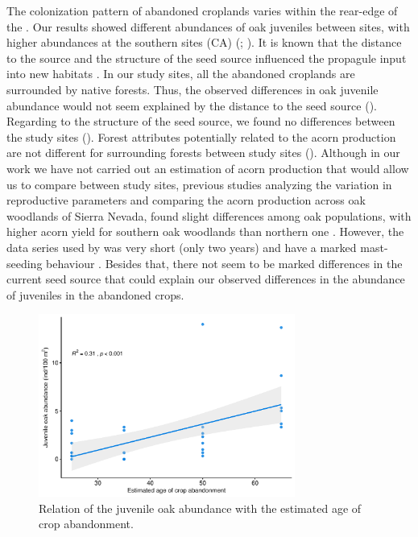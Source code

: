 The colonization pattern of abandoned croplands varies within the rear-edge of the \Qp. Our results showed different abundances of oak juveniles between sites, with higher abundances at the southern sites (CA) (; ). It is known that the distance to the source and the structure of the seed source influenced the propagule input into new habitats \autocites{Nathan2006LongDistanceDispersal,HewittKellman2002TreeSeed,Kureketal2019DispersalDistance}. In our study sites, all the abandoned croplands are surrounded by native forests. Thus, the observed differences in oak juvenile abundance would not seem explained by the distance to the seed source (). Regarding to the structure of the seed source, we found no differences 
between the study sites (). Forest attributes potentially related to the acorn production \autocite[][\emph{e.g.} tree density, basal area,]{GeaIzquierdoetal2006AcornProduction} are not different for surrounding forests between study sites (). Although in our work we have not carried out an estimation of acorn production that would allow us to compare between study sites, previous studies analyzing the variation in reproductive parameters and comparing the acorn production across oak woodlands of Sierra Nevada, found slight differences among oak populations, with higher acorn yield for southern oak woodlands than northern one \autocite{Leal2013AnalisisCrecimiento}.  However, the data series used by \citet{Leal2013AnalisisCrecimiento} was very short (only two years) and \Qpy have a marked mast-seeding behaviour \autocites{Bravoetal2008SelviculturaMontes,Gomezetal2001ProblemasRegeneracion}. Besides that, there not seem to be marked differences in the current seed source that could explain our observed differences in the abundance of juveniles in the abandoned crops. 

\begin{figure}
    \centering
    \includegraphics[width=\textwidth,height=6cm,
  keepaspectratio]{img/coloniza/coloniza-ageCrop.pdf}
    \caption{Relation of the juvenile oak abundance with the estimated age of crop abandonment.}
    \label{fig:coloniza:ageCrop}
\end{figure}

